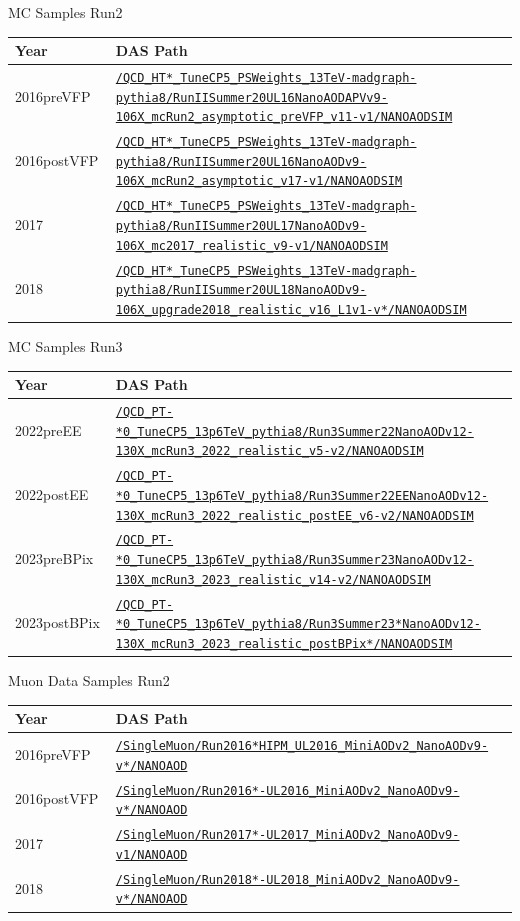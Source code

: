 \documentclass[]{beamer}
\def\daspath#1{\href{https://cmsweb.cern.ch/das/request?view=list\&limit=50\&instance=prod\%2Fglobal\&input=\%2F#1}{\small\nolinkurl{/#1}}}
\begin{document}
\begin{frame}{MC Samples Run2}
  \begin{tabular}{p{0.2\linewidth}p{0.8\linewidth}}
    Year & DAS Path \\ \hline
    2016preVFP & \daspath{QCD_HT*_TuneCP5_PSWeights_13TeV-madgraph-pythia8/RunIISummer20UL16NanoAODAPVv9-106X_mcRun2_asymptotic_preVFP_v11-v1/NANOAODSIM} \\
    2016postVFP & \daspath{QCD_HT*_TuneCP5_PSWeights_13TeV-madgraph-pythia8/RunIISummer20UL16NanoAODv9-106X_mcRun2_asymptotic_v17-v1/NANOAODSIM} \\
    2017 & \daspath{QCD_HT*_TuneCP5_PSWeights_13TeV-madgraph-pythia8/RunIISummer20UL17NanoAODv9-106X_mc2017_realistic_v9-v1/NANOAODSIM} \\
    2018 & \daspath{QCD_HT*_TuneCP5_PSWeights_13TeV-madgraph-pythia8/RunIISummer20UL18NanoAODv9-106X_upgrade2018_realistic_v16_L1v1-v*/NANOAODSIM} \\
  \end{tabular}
  
\end{frame}

\begin{frame}{MC Samples Run3}
  \begin{tabular}{p{0.2\linewidth}p{0.8\linewidth}}
    Year & DAS Path \\ \hline
    2022preEE & \daspath{QCD_PT-*0_TuneCP5_13p6TeV_pythia8/Run3Summer22NanoAODv12-130X_mcRun3_2022_realistic_v5-v2/NANOAODSIM} \\
    2022postEE & \daspath{QCD_PT-*0_TuneCP5_13p6TeV_pythia8/Run3Summer22EENanoAODv12-130X_mcRun3_2022_realistic_postEE_v6-v2/NANOAODSIM} \\
    2023preBPix & \daspath{QCD_PT-*0_TuneCP5_13p6TeV_pythia8/Run3Summer23NanoAODv12-130X_mcRun3_2023_realistic_v14-v2/NANOAODSIM} \\
    2023postBPix & \daspath{QCD_PT-*0_TuneCP5_13p6TeV_pythia8/Run3Summer23*NanoAODv12-130X_mcRun3_2023_realistic_postBPix*/NANOAODSIM} \\
  \end{tabular}
\end{frame}


\begin{frame}{Muon Data Samples Run2}
  \begin{tabular}{p{0.2\linewidth}p{0.8\linewidth}}
    Year & DAS Path \\ \hline
    2016preVFP & \daspath{SingleMuon/Run2016*HIPM_UL2016_MiniAODv2_NanoAODv9-v*/NANOAOD} \\
    2016postVFP & \daspath{SingleMuon/Run2016*-UL2016_MiniAODv2_NanoAODv9-v*/NANOAOD} \\
    2017 & \daspath{SingleMuon/Run2017*-UL2017_MiniAODv2_NanoAODv9-v1/NANOAOD} \\
    2018 & \daspath{SingleMuon/Run2018*-UL2018_MiniAODv2_NanoAODv9-v*/NANOAOD} \\
  \end{tabular}
  
\end{frame}
\end{document}
